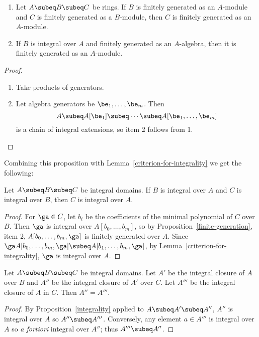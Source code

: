 \begin{pr}$\,$
\vspace{0cm}
\begin{enumerate}
\item Let $A\subeq B\subeq C$ be rings. If $B$ is finitely generated as an $A$-module and $C$ is finitely generated as a $B$-module, then $C$ is finitely generated as an $A$-module.
\item If $B$ is integral over $A$ and finitely generated as an $A$-algebra, then it is finitely generated as an $A$-module.\qedhere
\end{enumerate}
\end{pr}
\begin{proof}$\,$
\vspace{0cm}
\begin{enumerate}
\item Take products of generators.
\item 
Let algebra generators be $\be_1,\ldots, \be_m$. Then
\[A\subeq A[\be_1]\subeq \cdots \subeq A[\be_1,\ldots, \be_m]\]
is a chain of integral extensions, so item 2 follows from 1.\qedhere
\end{enumerate}
\end{proof}
Combining this proposition with Lemma~\ref{criterion-for-integrality} we get the following:
\begin{pr}
Let $A\subeq B\subeq C$ be integral domains. If $B$ is integral over $A$ and $C$ is integral over $B$, then $C$ is integral over $A$.
\end{pr}
\begin{proof}
For $\ga\in C$, let $b_i$ be the coefficients of the minimal polynomial of $C$ over $B$. Then $\ga$ is integral over $A[b_0,\ldots, b_m]$, so by Proposition~\ref{finite-generation}, item 2, $A[b_0,\ldots, b_m,\ga]$ is finitely generated over $A$. Since $\ga A[b_0,\ldots, b_m,\ga]\subeq A[b_1,\ldots, b_m,\ga]$, by Lemma~\ref{criterion-for-integrality}, $\ga$ is integral over $A$.
\end{proof}

\begin{lem}
Let $A\subeq B\subeq C$ be integral domains. Let $A'$ be the integral closure of $A$ over $B$ and $A''$ be the integral closure of $A'$ over $C$. Let $A'''$ be the integral closure of $A$ in $C$. %
Then $A''=A'''$.
\end{lem}
\begin{proof}
By Proposition~\ref{integrality} applied to $A\subeq A'\subeq A''$, $A''$ is integral over $A$ so $A''\subeq A'''$. Conversely, any element $a\in A'''$ is integral over $A$ so {\it a fortiori} integral over $A''$; thus $A'''\subeq A''$.
\end{proof}


